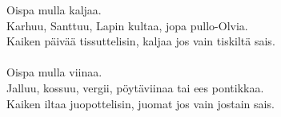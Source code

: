 
            Oispa mulla kaljaa. \\
            Karhuu, Santtuu, Lapin kultaa, jopa pullo-Olvia. \\
            Kaiken päivää tissuttelisin, kaljaa jos vain tiskiltä sais. \\
\hspace{10mm} \\
            Oispa mulla viinaa. \\
            Jalluu, kossuu, vergii, pöytäviinaa tai ees pontikkaa. \\
            Kaiken iltaa juopottelisin, juomat jos vain jostain sais. \\
